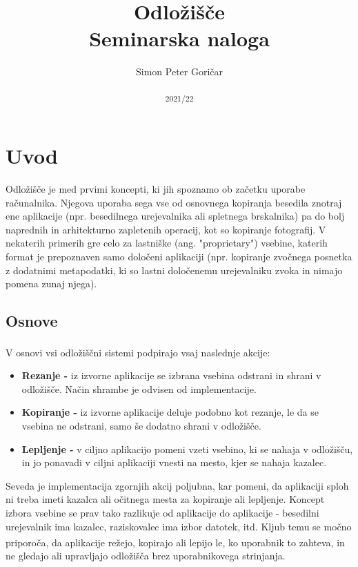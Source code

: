 \documentclass[12pt, A4]{article}
\title{%
	\textbf{Odložišče} \\
	\large Seminarska naloga
}
\author{Simon Peter Goričar}
\date{\textsubscript{2021/22}}
\begin{document}
	\begin{titlepage}
		\maketitle
	\end{titlepage}
	\pagebreak
	
	\tableofcontents
	\pagebreak
	
	
	\section{Uvod}	
	Odložišče je med prvimi koncepti, ki jih spoznamo ob začetku uporabe računalnika. Njegova uporaba sega vse od osnovnega kopiranja besedila znotraj ene aplikacije (npr. besedilnega urejevalnika ali spletnega brskalnika) pa do bolj naprednih in arhitekturno zapletenih operacij, kot so kopiranje fotografij. V nekaterih primerih gre celo za lastniške (ang. "proprietary") vsebine, katerih format je prepoznaven samo določeni aplikaciji (npr. kopiranje zvočnega posnetka z dodatnimi metapodatki, ki so lastni določenemu urejevalniku zvoka in nimajo pomena zunaj njega).
	
	\subsection{Osnove}
	V osnovi vsi odložiščni sistemi podpirajo vsaj naslednje akcije\textsuperscript{\cite{winclipboardabout}}:
	\begin{itemize}
		\item \textbf{Rezanje -} iz izvorne aplikacije se izbrana vsebina odstrani in shrani v odložišče. Način shrambe je odvisen od implementacije.
		\item \textbf{Kopiranje -} iz izvorne aplikacije deluje podobno kot rezanje, le da se vsebina ne odstrani, samo še dodatno shrani v odložišče.
		\item \textbf{Lepljenje -} v ciljno aplikacijo pomeni vzeti vsebino, ki se nahaja v odložišču, in jo ponavadi v ciljni aplikaciji vnesti na mesto, kjer se nahaja kazalec.
	\end{itemize}
	
	Seveda je implementacija zgornjih akcij poljubna, kar pomeni, da aplikaciji sploh ni treba imeti kazalca ali očitnega mesta za kopiranje ali lepljenje. Koncept izbora vsebine se prav tako razlikuje od aplikacije do aplikacije - besedilni urejevalnik ima kazalec, raziskovalec ima izbor datotek, itd. Kljub temu se močno priporoča\textsuperscript{\cite{winclipboardabout}}, da aplikacije režejo, kopirajo ali lepijo le, ko uporabnik to zahteva, in ne gledajo ali upravljajo odložišča brez uporabnikovega strinjanja.
	
\end{document}
